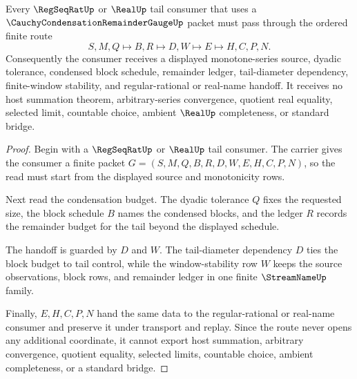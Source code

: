 \begin{theorem}
\label{thm:cauchy-condensation-remainder-gauge-real-handoff}
Every $\RegSeqRatUp$ or $\RealUp$ tail consumer that uses a $\CauchyCondensationRemainderGaugeUp$ packet must pass through the ordered finite route
$$
S,M,Q \longmapsto B,R \longmapsto D,W \longmapsto E \longmapsto H,C,P,N .
$$
Consequently the consumer receives a displayed monotone-series source, dyadic tolerance, condensed block schedule, remainder ledger, tail-diameter dependency, finite-window stability, and regular-rational or real-name handoff. It receives no host summation theorem, arbitrary-series convergence, quotient real equality, selected limit, countable choice, ambient $\RealUp$ completeness, or standard bridge.
\end{theorem}
\begin{proof}
Begin with a $\RegSeqRatUp$ or $\RealUp$ tail consumer. The carrier gives the consumer a finite packet $G=(S,M,Q,B,R,D,W,E,H,C,P,N)$, so the read must start from the displayed source and monotonicity rows.

Next read the condensation budget. The dyadic tolerance $Q$ fixes the requested size, the block schedule $B$ names the condensed blocks, and the ledger $R$ records the remainder budget for the tail beyond the displayed schedule.

The handoff is guarded by $D$ and $W$. The tail-diameter dependency $D$ ties the block budget to tail control, while the window-stability row $W$ keeps the source observations, block rows, and remainder ledger in one finite $\StreamNameUp$ family.

Finally, $E,H,C,P,N$ hand the same data to the regular-rational or real-name consumer and preserve it under transport and replay. Since the route never opens any additional coordinate, it cannot export host summation, arbitrary convergence, quotient equality, selected limits, countable choice, ambient completeness, or a standard bridge.
\end{proof}


